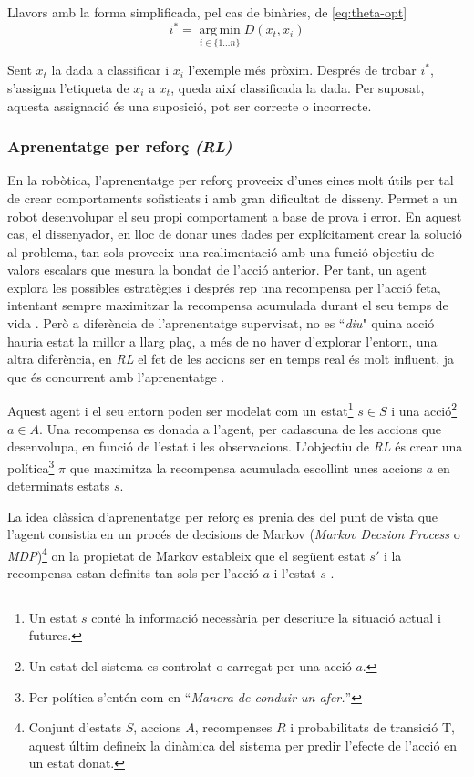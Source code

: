 \documentclass[12pt,a4paper,final,twoside]{article}
\begin{document}
Llavors amb la forma simplificada, pel cas de binàries, de \eqref{eq:theta-opt}
\begin{equation} \label{eq:theta-opt-exemple}
i^*=\operatorname*{arg\,min}_{i\in\{1\dots n\}} D(x_{t}, x_{i})
\end{equation}

Sent $x_{t}$ la dada a classificar i $x_{i}$ l'exemple més pròxim. Després de trobar $i^*$, s'assigna l'etiqueta de $x_{i}$ a $x_{t}$, queda així classificada la dada. Per suposat, aquesta assignació és una suposició, pot ser correcte o incorrecte.


\subsubsection{Aprenentatge per reforç \textit{(RL)}}
\label{RL-estat-de-l'art}

En la robòtica, l'aprenentatge per reforç proveeix d'unes eines molt útils per tal de crear comportaments sofisticats i amb gran dificultat de disseny. Permet a un robot desenvolupar el seu propi comportament a base de prova i error. En aquest cas, el dissenyador, en lloc de donar unes dades per explícitament crear la solució al problema, tan sols proveeix una realimentació amb una funció objectiu de valors escalars que mesura la bondat de l'acció anterior. Per tant, un agent explora les possibles estratègies i després rep una recompensa per l'acció feta, intentant sempre maximitzar la recompensa acumulada durant el seu temps de vida \cite{Kober2009}. Però a diferència de l'aprenentatge supervisat, no es ``\textit{diu}"  quina acció hauria estat la millor a llarg plaç, a més de no haver d'explorar l'entorn, una altra diferència, en \textit{RL} el fet de les accions ser en temps real és molt influent, ja que és concurrent amb l'aprenentatge \cite{Kaelbling1996}. 

Aquest agent i el seu entorn poden ser modelat com un estat\footnote{Un estat $s$ conté la informació necessària per descriure la situació actual i futures.}  $s\in S $ i una acció\footnote{Un estat del sistema es controlat o carregat per una acció $a$.}  $a \in A$. Una recompensa es donada a l'agent, per cadascuna de les accions que desenvolupa, en funció de l'estat i les observacions. L'objectiu de \textit{RL} és crear una política\footnote{Per política s'entén com en \cite{iec-dlc} ``\textit{Manera de conduir un afer.}''} $\pi$ que maximitza la recompensa acumulada escollint unes accions $a$ en determinats estats $s$.

La idea clàssica d'aprenentatge per reforç es prenia des del punt de vista que l'agent consistia en un procés de decisions de Markov (\textit{Markov Decsion Process} o \textit{MDP})\footnote{Conjunt d'estats $S$, accions $A$, recompenses $R$ i probabilitats de transició T, aquest últim defineix la dinàmica del sistema per predir l'efecte de l'acció en un estat donat.} on la propietat de Markov estableix que el següent estat $s'$ i la recompensa estan definits tan sols per l'acció $a$ i l'estat $s$ \cite{Sutton1998}. %
\end{document}

